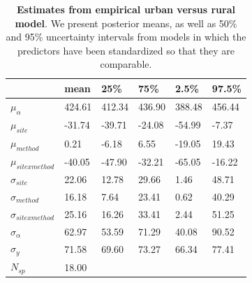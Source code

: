 \documentclass{article}\usepackage[]{graphicx}\usepackage[]{color}
\begin{document}
\begin{table}[ht]
\centering
\caption{\textbf{Estimates from empirical urban versus rural model}. We present posterior means, as well as 50\% and 95\% uncertainty intervals from models in which the predictors have been standardized so that they are comparable.} 
\label{tab:real}
\begingroup\footnotesize
\begin{tabular}{|p{}|p{}p{}p{}p{}p{}|}
  \hline
 & mean & 25\% & 75\% & 2.5\% & 97.5\% \\ 
  \hline
$\mu_{\alpha}$ & 424.61 & 412.34 & 436.90 & 388.48 & 456.44 \\ 
  $\mu_{site}$ & -31.74 & -39.71 & -24.08 & -54.99 & -7.37 \\ 
  $\mu_{method}$ & 0.21 & -6.18 & 6.55 & -19.05 & 19.43 \\ 
  $\mu_{sitexmethod}$ & -40.05 & -47.90 & -32.21 & -65.05 & -16.22 \\ 
  $\sigma_{site}$ & 22.06 & 12.78 & 29.66 & 1.46 & 48.71 \\ 
  $\sigma_{method}$ & 16.18 & 7.64 & 23.41 & 0.62 & 40.29 \\ 
  $\sigma_{sitexmethod}$ & 25.16 & 16.26 & 33.41 & 2.44 & 51.25 \\ 
  $\sigma_{\alpha}$ & 62.97 & 53.59 & 71.29 & 40.08 & 90.52 \\ 
  $\sigma_{y}$ & 71.58 & 69.60 & 73.27 & 66.34 & 77.41 \\ 
   \hline
$N_{sp}$ & 18.00 &  &  &  &  \\ 
   \hline
\end{tabular}
\endgroup
\end{table}
\end{document}
